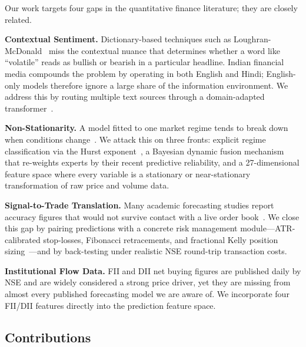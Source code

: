 \documentclass[10pt,a4paper,twoside]{article}
\begin{document}
Our work targets four gaps in the quantitative finance literature; they are
closely related.

\textbf{Contextual Sentiment.} Dictionary-based techniques such as
Loughran-McDonald~\cite{loughran2011} miss the contextual nuance that
determines whether a word like ``volatile'' reads as bullish or bearish in a
particular headline. Indian financial media compounds the problem by operating
in both English and Hindi; English-only models therefore ignore a large share
of the information environment. We address this by routing multiple text
sources through a domain-adapted transformer~\cite{araci2019}.

\textbf{Non-Stationarity.} A model fitted to one market regime tends to
break down when conditions change~\cite{hamilton1989}. We attack this on three
fronts: explicit regime classification via the Hurst exponent~\cite{hurst1951},
a Bayesian dynamic fusion mechanism that re-weights experts by their recent
predictive reliability, and a 27-dimensional feature space where every variable
is a stationary or near-stationary transformation of raw price and volume data.

\textbf{Signal-to-Trade Translation.} Many academic forecasting studies report
accuracy figures that would not survive contact with a live order
book~\cite{lopez2018}. We close this gap by pairing predictions with a
concrete risk management module---ATR-calibrated stop-losses, Fibonacci
retracements, and fractional Kelly position sizing~\cite{kelly1956}---and by
back-testing under realistic NSE round-trip transaction costs.

\textbf{Institutional Flow Data.} FII and DII net buying figures are published
daily by NSE and are widely considered a strong price driver, yet they are
missing from almost every published forecasting model we are aware of. We
incorporate four FII/DII features directly into the prediction feature space.

\subsection{Contributions}
\end{document}
